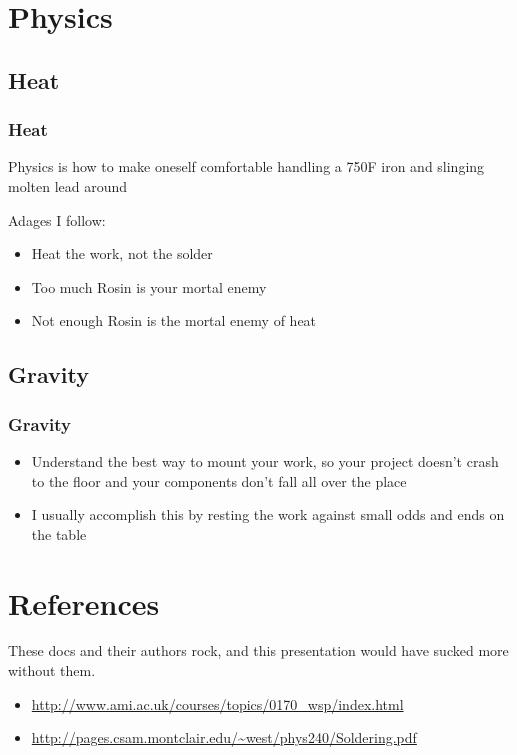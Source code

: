 \documentclass{beamer}
\begin{document}
\section{Physics}
\subsection{Heat}
\begin{frame}
  \frametitle{Heat}
  Physics is how to make oneself comfortable handling a 750\textdegree F  iron and slinging molten lead around 

  Adages I follow:
  \begin{itemize}
    \item Heat the work, not the solder
    \item Too much Rosin is your mortal enemy
    \item Not enough Rosin is the mortal enemy of heat
  \end{itemize}
\end{frame}

\subsection{Gravity}
\begin{frame}
  \frametitle{Gravity}
  \begin{itemize}
    \item Understand the best way to mount your work, so your project
      doesn't crash to the floor and your components don't fall all
      over the place
    \item I usually accomplish this by resting the work against small
      odds and ends on the table
  \end{itemize}
\end{frame}

\section{References}

\begin{frame}
  These docs and their authors rock, and this presentation would have
  sucked more without them.
  \begin{itemize}
    \item \url{http://www.ami.ac.uk/courses/topics/0170_wsp/index.html}
    \item \url{http://pages.csam.montclair.edu/~west/phys240/Soldering.pdf}
  \end{itemize}
\end{frame}
\end{document}
